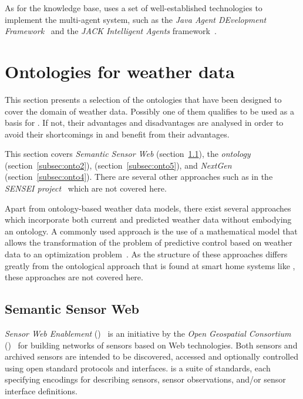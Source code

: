 As for the knowledge base, \thinkhome uses a set of well-established technologies to implement the multi-agent system, such as the \emph{Java Agent DEvelopment Framework}~\cite{jade} and the \emph{JACK Intelligent Agents} framework~\cite{jack_agents}.

\section{Ontologies for weather data}
\label{sec:weather_ontologies}

This section presents a selection of the ontologies that have been designed to cover the domain of weather data. Possibly one of them qualifies to be used as a basis for \smarthomeweather. If not, their advantages and disadvantages are analysed in order to avoid their shortcomings in \smarthomeweather and benefit from their advantages.

This section covers \emph{Semantic Sensor Web} (section~\ref{subsec:onto1}), the \emph{ ontology} (section~\ref{subsec:onto2}), \emph{} (section~\ref{subsec:onto5}), and \emph{NextGen} (section~\ref{subsec:onto4}). There are several other approaches such as in the \emph{SENSEI project}~\cite{sensei} which are not covered here.

Apart from ontology-based weather data models, there exist several approaches which incorporate both current and predicted weather data without embodying an ontology. A commonly used approach is the use of a mathematical model that allows the transformation of the problem of predictive control based on weather data to an optimization problem~\cite{NonOntologicalApproach1,NonOntologicalApproach2}. As the structure of these approaches differs greatly from the ontological approach that is found at smart home systems like \thinkhome, these approaches are not covered here.

\subsection{Semantic Sensor Web}
\label{subsec:onto1}

\emph{Sensor Web Enablement} ()~\cite{SensorWeb} is an initiative by the \emph{Open Geospatial Consortium} ()~\cite{OGC} for building networks of sensors based on Web technologies. Both sensors and archived sensors are intended to be discovered, accessed and optionally controlled using open standard protocols and interfaces.  is a suite of standards, each specifying encodings for describing sensors, sensor observations, and/or sensor interface definitions.

